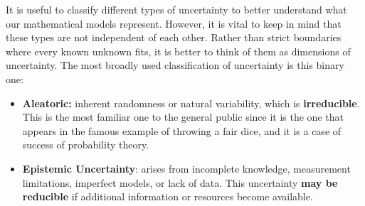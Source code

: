 \begin{definition}
    \cite{UncertaintySciences}
\end{definition}

It is useful to classify different types of uncertainty to better understand what our mathematical models represent. However, it is vital to keep in mind that these types are not independent of each other. Rather than strict boundaries where every known unknown fits, it is better to think of them as dimensions of uncertainty. The most broadly used classification of uncertainty is this binary one:\\

\begin{itemize}
    \item \textbf{Aleatoric:} inherent randomness or natural variability, which is \textbf{irreducible}. This is the most familiar one to the general public since it is the one that appears in the famous example of throwing a fair dice, and it is a case of success of probability theory.
    \item \textbf{Epistemic Uncertainty}: arises from incomplete knowledge, measurement limitations, imperfect models, or lack of data. This uncertainty \textbf{may be reducible} if additional information or resources become available. 
\end{itemize}

